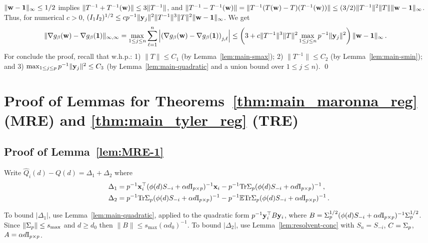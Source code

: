 \documentclass[times,sort&compress,3p]{elsarticle}
\begin{document}
$\|{\bf w}-{\bf 1}\|_\infty\le 1/2$ implies $\|T^{-1}+T^{-1}({\bf w})\|\le 3\|T^{-1}\|$, and $\|T^{-1}-T^{-1}({\bf w})\|= \|T^{-1}(T({\bf w})-T)(T^{-1}({\bf w}))\|\le (3/2)\|T^{-1}\|^2\|T\|\|{\bf w}-{\bf 1}\|_\infty$. Thus, for numerical $c>0$, ${(I_1I_2)^{1/2}\le cp^{-1}\|{\bf y}_{j}\|^2\|T^{-1}\|^3\|T\|^2\|{\bf w}-{\bf 1}\|_\infty}$. We get
\begin{align*}
    \|\nabla g_\beta({\bf w})-\nabla g_\beta({\bf 1})\|_{\infty,\infty}
    &=\max_{1\le j \le n} \sum_{\ell=1}^n \left| \left(\nabla g_\beta({\bf w})-\nabla g_\beta({\bf 1})\right)_{j,\ell} \right| 
    \le \left(3 + c\|T^{-1}\|^3\|T\|^2\max_{1\le j \le n}p^{-1}\|{\bf y}_j\|^2\right)\|{\bf w}-{\bf 1}\|_\infty \,.
\end{align*}
For conclude the proof, recall  that w.h.p.: 1) $\|T\|\le C_1$ (by Lemma~\ref{lem:main-smax}); 2) $\|T^{-1}\|\le C_2$ (by Lemma~\ref{lem:main-smin}); and 3) $\max_{1\le j \le p} p^{-1}\|{\bf y}_j\|^2\le C_3$ (by Lemma~\ref{lem:main-quadratic} and a union bound over $1\le j \le n$).
\qed       
  

\section{Proof of Lemmas for Theorems~\ref{thm:main_maronna_reg} (MRE) and \ref{thm:main_tyler_reg} (TRE)}

\subsection{Proof of Lemma~\ref{lem:MRE-1}}
\label{sec:proof-lem:MRE-1}

Write $\hat{Q}_i(d)-Q(d)=\Delta_1+\Delta_2$ where
\begin{align*}
    &\Delta_1 = p^{-1}{\bf x}_i^\top(\phi(d)S_{-i}+\alpha d \mathrm{I}_{p \times p})^{-1}{\bf x}_i-p^{-1}\textrm{Tr} \Sigma_p(\phi(d)S_{-i}+\alpha d \mathrm{I}_{p \times p})^{-1} \,, \\ 
    &\Delta_2 = p^{-1}\textrm{Tr} \Sigma_p(\phi(d)S_{-i}+\alpha d \mathrm{I}_{p \times p})^{-1} - p^{-1}{\mathbb{E}}\textrm{Tr} \Sigma_p(\phi(d)S_{-i}+\alpha d \mathrm{I}_{p \times p})^{-1} \,. 
\end{align*}

To bound $|\Delta_1|$, use Lemma~\ref{lem:main-quadratic}, applied to the quadratic form $p^{-1}{\bf y}_i^\top B {\bf y}_i$, where $B=\Sigma_p^{1/2}(\phi(d)S_{-i}+\alpha d \mathrm{I}_{p \times p})^{-1}\Sigma_p^{1/2}$. Since $\|\Sigma_p\|\le s_{\max}$ and $d\ge d_0$ then $\|B\|\le s_{\max}(\alpha d_0)^{-1}$. 
To bound $|\Delta_2|$, use Lemma~\ref{lem:resolvent-conc} with $S_n=S_{-i}$, $C=\Sigma_p$, 
$A=\alpha d \mathrm{I}_{p \times p}$. 
\end{document}
